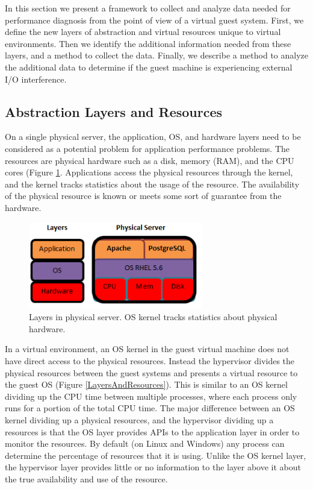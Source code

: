 In this section we present a framework to collect and analyze data needed for performance diagnosis from the point of view of a virtual guest system. 
First, we define the new layers of abstraction and virtual resources unique to virtual environments.  
Then we identify the additional information needed from these layers, and a method to collect the data.
Finally, we describe a method to analyze the additional data to determine if the guest machine is experiencing external I/O interference.

\subsection{Abstraction Layers and Resources}
On a single physical server, the application, OS, and hardware layers need to be considered as a potential problem for application performance problems.  The resources are physical hardware such as a disk, memory (RAM), and the CPU cores (Figure \ref{PhysicalLayers}.  Applications access the physical resources through the kernel, and the kernel tracks statistics about the usage of the resource.  The availability of the physical resource is known or meets some sort of guarantee from the hardware.

\begin{figure}[!h]
  \includegraphics[width=3in]{images/LayersPhysical.png}
  \caption{Layers in physical server.  OS kernel tracks statistics about physical hardware.}
  \label{PhysicalLayers}
\end{figure}

In a virtual environment, an OS kernel in the guest virtual machine does not have direct access to the physical resources.  Instead the hypervisor divides the physical resources between the guest systems and presents a virtual resource to the guest OS (Figure \ref{LayersAndResources}).
This is similar to an OS kernel dividing up the CPU time between multiple processes, where each process only runs for a portion of the total CPU time.  
The major difference between an OS kernel dividing up a physical resources, and the hypervisor dividing up a resources is that the OS layer provides APIs to the application layer in order to monitor the resources.  By default (on Linux and Windows) any process can determine the percentage of resources that it is using.  Unlike the OS kernel layer, the hypervisor layer provides little or no information to the layer above it about the true availability and use of the resource. 

